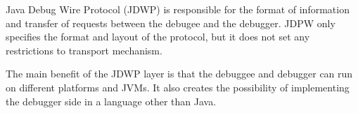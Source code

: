 \documentclass[..thesis.tex]{subfiles}
\begin{document}
Java Debug Wire Protocol (JDWP) is responsible for the format of information and transfer of requests between the debugee and the debugger.
JDPW only specifies the format and layout of the protocol, but it does not set any restrictions to transport mechanism.
\cite{oracle_jpda_jdwp}

The main benefit of the JDWP layer is that the debuggee and debugger can run on different platforms and JVMs.
It also creates the possibility of implementing the debugger side in a language other than Java.
\end{document}

